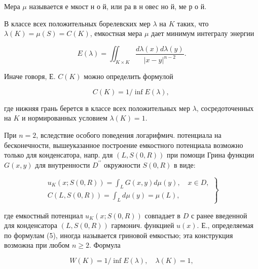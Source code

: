 \documentclass[10pt]{article}
\begin{document}
Мера $\mu$ называется е мкост н о й, или ра в н овес но й, ме р о й.



В классе всех положительных борелевских мер $\lambda$ на $K$ таких, что $\lambda(K)=\mu(S)=C(K)$, емкостная мера $\mu$ дает минимум интегралу энергии



\[

E(\lambda)=\iint_{K \times K} \frac{d \lambda(x) d \lambda(y)}{|x-y|^{n-2}} .

\]



Иначе говоря, Е. $C(K)$ можно определить формулой



\[

C(K)=1 / \inf E(\lambda) \text {, }

\]



где нижняя грань берется в классе всех положительных мер $\lambda$, сосредоточенных на $K$ и нормированных условием $\lambda(K)=1$.



При $n=2$, вследствие особого поведения логарифмич. потенциала на бесконечности, вышеуказанное построение емкостного потенциала возможно только для конденсатора, напр. для $(L, S(0, R))$ при помощи Грина функции $G(x, y)$ для внутренности $D^{\prime \prime}$ окружности $S(0, R)$ в виде:



\[

\left.\begin{array}{l}

u_{K}(x ; S(0, R))=\int_{L} G(x, y) d \mu(y), \quad x \in D, \\

C(L, S(0, R))=\int_{L} d \mu(y)=\mu(L),

\end{array}\right\}

\]



где емкостный потенциал $u_{K}(x ; S(0, R))$ совпадает в $D$ с ранее введенной для конденсатора $(L, S(0, R))$ гармонич. функцией $u(x)$. Е., определяемая по формулам (5), иногда называется гриновой емкостью; эта конструкция возможна при любом $n \geqslant 2$. Формула



\[

W(K)=1 / \inf E(\lambda), \quad \lambda(K)=1,

\]
\end{document}
